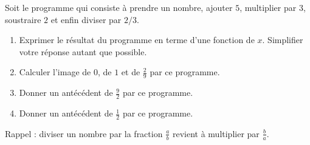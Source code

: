 
\begin{exercice}\label{exoSeconde-0058}

Soit le programme qui consiste à prendre un nombre, ajouter $5$, multiplier par \( 3\), soustraire \( 2\) et enfin diviser par \( 2/3\). 
\begin{enumerate}
    \item
        Exprimer le résultat du programme en terme d'une fonction de \( x\). Simplifier votre réponse autant que possible.
    \item
        Calculer l'image de \( 0\), de \( 1\) et de \( \frac{ 2 }{ 9 }\) par ce programme.
    \item
        Donner un antécédent de \( \frac{ 9 }{2}\) par ce programme.
    \item
        Donner un antécédent de \( \frac{ 1 }{2}\) par ce programme.
\end{enumerate}

Rappel : diviser un nombre par la fraction \( \frac{ a }{ b }\) revient à multiplier par \( \frac{ b }{ a }\).

\end{exercice}
